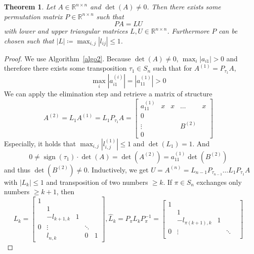\documentclass[a4paper]{article}
\newcounter{lecref}[section]
\numberwithin{lecref}{section}
\theoremstyle{break}
\newtheorem{thm}[lecref]{Theorem}
\newcommand{\Abs}[1]{\left|#1\right|}
\DeclareMathOperator{\sign}{sign}
\begin{document}
\begin{thm} %
  Let $A \in \mathbb R^{n \times n}$ and $\det(A) \neq 0$. Then there exists some permutation matrix $P \in \mathbb R^{n \times n}$ such that
  \[ PA = LU \]
  with lower and upper triangular matrices $L, U \in \mathbb R^{n \times n}$. Furthermore $P$ can be chosen such that $\Abs{L} \coloneqq \max_{i,j} \Abs{l_{ij}} \leq 1$.
\end{thm}
\begin{proof}
  We use Algorithm~\ref{algo2}. Because $\det(A) \neq 0$, $\max_i{\Abs{a_{i1}}} > 0$ and therefore there exists some transposition $\tau_1 \in S_n$ such that for $A^{(1)} = P_{\tau_1} A$,
  \[ \max_i \Abs{a_{i1}^{(i)}} = \Abs{a_{11}^{(1)}} > 0 \]
  We can apply the elimination step and retrieve a matrix of structure
  \[
    A^{(2)} = L_1 A^{(1)} = L_1 P_{\tau_1} A = \begin{bmatrix}
      a_{11}^{(1)} & x & x & \dots & x \\
    \hline
      0            &   &   &       & \\
      \vdots       &   &   & B^{(2)} & \\
      0            &   &   &       &
    \end{bmatrix}
  \]
  Especially, it holds that $\max_{i,j} \Abs{l_{i,j}^{(1)}} \leq 1$ and $\det(L_1) = 1$. And
  \[ 0 \neq \sign(\tau_1) \cdot \det(A) = \det(A^{(2)}) = a_{11}^{(1)} \det(B^{(2)}) \]
  and thus $\det(B^{(2)}) \neq 0$. Inductively, we get $U = A^{(n)} = L_{n-1} P_{\tau_{n-1}} \dots L_1 P_{\tau_1} A$
  with $\Abs{L_k} \leq 1$ and transposition of two numbers $\geq k$.
  If $\pi \in S_n$  exchanges only numbers $\geq k+1$, then
  \[
    L_k = \begin{bmatrix}
      1 &            &   &        & \\
        & 1          &   &        & \\
        & -l_{k+1,k} & 1 &        & \\
      0 & \vdots     &   & \ddots & \\
        & l_{n,k}    &   & 0      & 1
    \end{bmatrix},
    \hat{L}_k = P_{\pi} L_k P_{\pi}^{-1}
    = \begin{bmatrix}
      1 &            &   &        & \\
        & 1          &   &        & \\
        & -l_{\pi(k+1),k} & 1 &        & \\
      0 & \vdots     &   & \ddots & \\

\end{bmatrix}\]
\end{proof}
\end{document}
